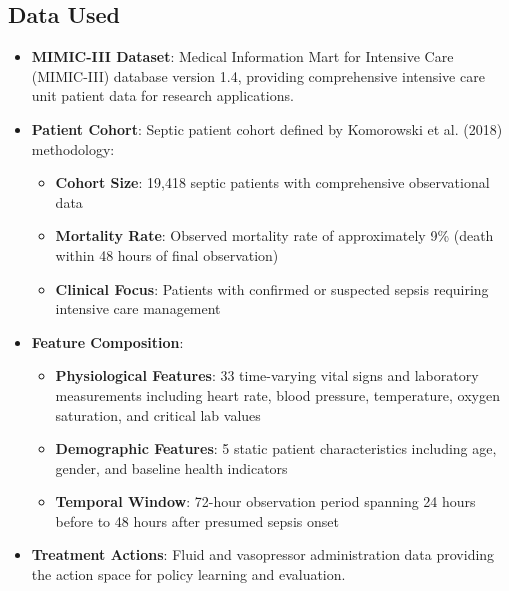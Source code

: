 \subsection*{Data Used}
\begin{itemize}
    \item \textbf{MIMIC-III Dataset}: Medical Information Mart for Intensive Care (MIMIC-III) database version 1.4, providing comprehensive intensive care unit patient data for research applications.
    \item \textbf{Patient Cohort}: Septic patient cohort defined by Komorowski et al. (2018) methodology:
    \begin{itemize}
        \item \textbf{Cohort Size}: 19,418 septic patients with comprehensive observational data
        \item \textbf{Mortality Rate}: Observed mortality rate of approximately 9\% (death within 48 hours of final observation)
        \item \textbf{Clinical Focus}: Patients with confirmed or suspected sepsis requiring intensive care management
    \end{itemize}
    \item \textbf{Feature Composition}:
    \begin{itemize}
        \item \textbf{Physiological Features}: 33 time-varying vital signs and laboratory measurements including heart rate, blood pressure, temperature, oxygen saturation, and critical lab values
        \item \textbf{Demographic Features}: 5 static patient characteristics including age, gender, and baseline health indicators
        \item \textbf{Temporal Window}: 72-hour observation period spanning 24 hours before to 48 hours after presumed sepsis onset
    \end{itemize}
    \item \textbf{Treatment Actions}: Fluid and vasopressor administration data providing the action space for policy learning and evaluation.
\end{itemize}

